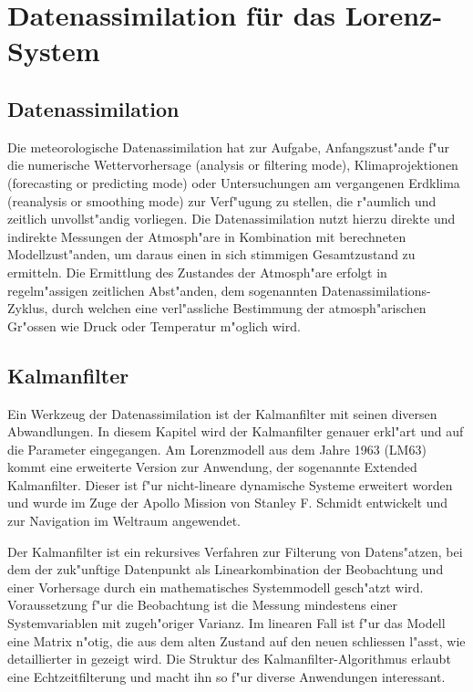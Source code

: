 %
%
%
\chapter{Datenassimilation für das Lorenz-System\label{chapter:kalman}}
\begin{refsection}

\section{Datenassimilation}
Die meteorologische Datenassimilation hat zur Aufgabe, Anfangszust"ande f"ur die numerische Wettervorhersage (analysis or filtering mode), Klimaprojektionen (forecasting or predicting mode) oder Untersuchungen am vergangenen Erdklima (reanalysis or smoothing mode) zur Verf"ugung zu stellen, die r"aumlich und zeitlich unvollst"andig vorliegen. Die Datenassimilation nutzt hierzu direkte und indirekte Messungen der Atmosph"are in Kombination mit berechneten Modellzust"anden, um daraus einen in sich stimmigen Gesamtzustand zu ermitteln. Die Ermittlung des Zustandes der Atmosph"are erfolgt in regelm"assigen zeitlichen Abst"anden, dem sogenannten Datenassimilations-Zyklus, durch welchen eine verl"assliche Bestimmung der atmosph"arischen Gr"ossen wie Druck oder Temperatur m"oglich wird.

\section{Kalmanfilter}
Ein Werkzeug der Datenassimilation ist der Kalmanfilter mit seinen diversen Abwandlungen. In diesem Kapitel wird der Kalmanfilter genauer erkl"art und auf die Parameter eingegangen. Am Lorenzmodell aus dem Jahre 1963 (LM63) kommt eine erweiterte Version zur Anwendung, der sogenannte Extended Kalmanfilter. Dieser ist f"ur nicht-lineare dynamische Systeme erweitert worden und wurde im Zuge der Apollo Mission von Stanley F. Schmidt entwickelt und zur Navigation im Weltraum angewendet\cite{skript:NASAKalman}.

Der Kalmanfilter ist ein rekursives Verfahren zur Filterung von Datens"atzen, bei dem  der zuk"unftige Datenpunkt als Linearkombination der Beobachtung und einer Vorhersage durch ein mathematisches Systemmodell gesch"atzt wird. Voraussetzung f"ur die Beobachtung ist die Messung mindestens einer Systemvariablen mit zugeh"origer Varianz. Im linearen Fall ist f"ur das Modell eine Matrix n"otig, die aus dem alten Zustand auf den neuen schliessen l"asst, wie detaillierter in\cite{skript:WRStat} gezeigt wird. Die Struktur des Kalmanfilter-Algorithmus erlaubt eine Echtzeitfilterung und macht ihn so f"ur diverse Anwendungen interessant.


\end{refsection}
